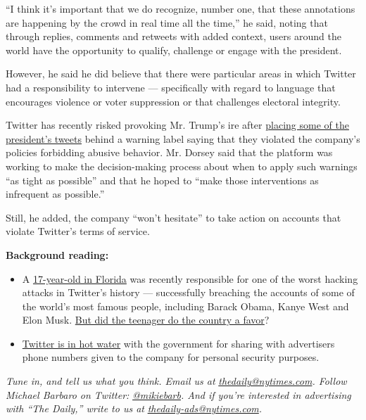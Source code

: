 ``I think it's important that we do recognize, number one, that these
annotations are happening by the crowd in real time all the time,'' he
said, noting that through replies, comments and retweets with added
context, users around the world have the opportunity to qualify,
challenge or engage with the president.

However, he said he did believe that there were particular areas in
which Twitter had a responsibility to intervene --- specifically with
regard to language that encourages violence or voter suppression or that
challenges electoral integrity.

Twitter has recently risked provoking Mr. Trump's ire after
\href{https://www.nytimes.com/2020/06/23/technology/trump-twitter-label-seattle.html}{placing
some of the president's tweets} behind a warning label saying that they
violated the company's policies forbidding abusive behavior. Mr. Dorsey
said that the platform was working to make the decision-making process
about when to apply such warnings ``as tight as possible'' and that he
hoped to ``make those interventions as infrequent as possible.''

Still, he added, the company ``won't hesitate'' to take action on
accounts that violate Twitter's terms of service.

\textbf{Background reading:}

\begin{itemize}
\item
  A
  \href{https://www.nytimes.com/2020/08/02/technology/florida-teenager-twitter-hack.html}{17-year-old
  in Florida} was recently responsible for one of the worst hacking
  attacks in Twitter's history --- successfully breaching the accounts
  of some of the world's most famous people, including Barack Obama,
  Kanye West and Elon Musk.
  \href{https://www.nytimes.com/2020/07/16/us/politics/twitter-hack.html}{But
  did the teenager do the country a favor}?
\item
  \href{https://www.nytimes.com/2020/08/04/technology/europe-big-tech.html}{Twitter
  is in hot water} with the government for sharing with advertisers
  phone numbers given to the company for personal security purposes.
\end{itemize}

\emph{Tune in, and tell us what you think. Email us at}
\href{mailto:thedaily@nytimes.com}{\emph{thedaily@nytimes.com}}\emph{.
Follow Michael Barbaro on Twitter:}
\href{https://twitter.com/mikiebarb}{\emph{@mikiebarb}}\emph{. And if
you're interested in advertising with ``The Daily,'' write to us at}
\href{mailto:thedaily-ads@nytimes.com}{\emph{thedaily-ads@nytimes.com}}\emph{.}

